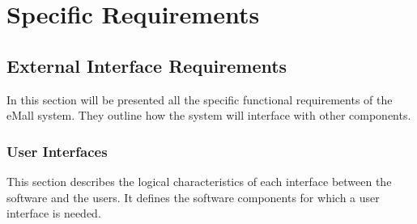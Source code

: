 \chapter{Specific Requirements}
\section{External Interface Requirements}
In this section will be presented all the specific functional requirements of the eMall system.
They outline how the system will interface with other components. 
\subsection{User Interfaces}
This section describes the logical characteristics of each interface between the software and the users. It defines the software components for which a user interface is needed. 
